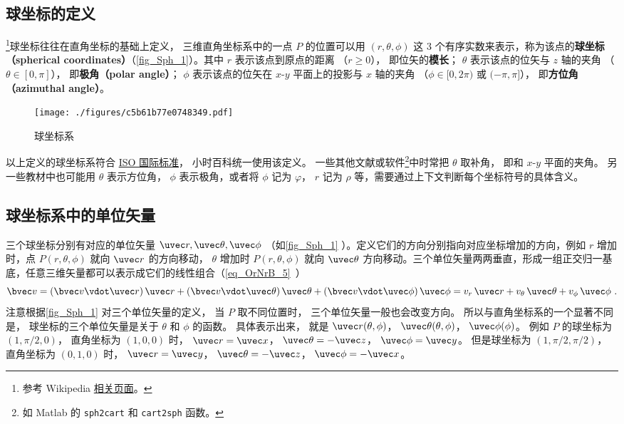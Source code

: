 

\subsection{球坐标的定义}

\footnote{参考 Wikipedia \href{https://en.wikipedia.org/wiki/Spherical_coordinate_system}{相关页面}。}球坐标往往在直角坐标的基础上定义， 三维直角坐标系中的一点 $P$ 的位置可以用 $(r,\theta ,\phi )$ 这 3 个有序实数来表示，称为该点的\textbf{球坐标（spherical coordinates）}（\autoref{fig_Sph_1}）。其中 $r$ 表示该点到原点的距离 （$r \geqslant 0$）， 即位矢的\textbf{模长}； $\theta$ 表示该点的位矢与 $z$ 轴的夹角 （$\theta  \in [0,\pi]$）， 即\textbf{极角（polar angle）}； $\phi$ 表示该点的位矢在 $x$-$y$ 平面上的投影与 $x$ 轴的夹角 （$\phi  \in [0,2\pi)$ 或 $(- \pi,\pi]$）， 即\textbf{方位角（azimuthal angle）}。

\begin{figure}[ht]
\centering
\texttt{[image: ./figures/c5b61b77e0748349.pdf]}
\caption{球坐标系}\label{fig_Sph_1}
\end{figure}

以上定义的球坐标系符合 \href{https://www.iso.org/standard/64973.html}{ISO 国际标准}， 小时百科统一使用该定义。 一些其他文献或软件\footnote{如 Matlab 的 \lstinline|sph2cart| 和 \lstinline|cart2sph| 函数。}中时常把 $\theta$ 取补角， 即和 $x$-$y$ 平面的夹角。 另一些教材中也可能用 $\theta $ 表示方位角， $\phi $ 表示极角，或者将 $\phi $ 记为 $\varphi $，  $r$ 记为 $\rho $ 等，需要通过上下文判断每个坐标符号的具体含义。

\subsection{球坐标系中的单位矢量}
三个球坐标分别有对应的单位矢量 $\uvec r, \uvec\theta, \uvec\phi$ （如\autoref{fig_Sph_1} ）。定义它们的方向分别指向对应坐标增加的方向，例如 $r$ 增加时，点 $P(r,\theta ,\phi )$ 就向 $\uvec r$ 的方向移动， $\theta$ 增加时 $P(r,\theta ,\phi )$ 就向 $\uvec \theta$ 方向移动。三个单位矢量两两垂直，形成一组正交归一基底，任意三维矢量都可以表示成它们的线性组合（\autoref{eq_OrNrB_5}~）
\begin{equation}\label{eq_Sph_1}
\bvec v = (\bvec v \vdot \uvec r)\,\uvec r + (\bvec v \vdot \uvec \theta)\,\uvec \theta  + (\bvec v \vdot \uvec \phi)\,\uvec \phi  = v_r \,\uvec r + v_\theta \,\uvec \theta  + v_\phi \,\uvec \phi ~.
\end{equation}
注意根据\autoref{fig_Sph_1} 对三个单位矢量的定义， 当 $P$ 取不同位置时， 三个单位矢量一般也会改变方向。 所以与直角坐标系的一个显著不同是， 球坐标的三个单位矢量是关于 $\theta$ 和 $\phi$ 的函数。 具体表示出来， 就是 $\uvec r(\theta ,\phi )$，  $\uvec \theta (\theta ,\phi )$，  $\uvec \phi (\phi )$。 
例如 $P$ 的球坐标为 $(1, \pi/2, 0)$， 直角坐标为 $(1, 0, 0)$ 时，
$\uvec r = \uvec x$， $\uvec \theta  =  - \uvec z$， $\uvec \phi  = \uvec y$。 
但是球坐标为 $(1, \pi/2, \pi/2)$， 直角坐标为 $(0, 1, 0)$ 时， $\uvec r = \uvec y$， $\uvec \theta  =  - \uvec z$， $\uvec \phi  =  - \uvec x$。

